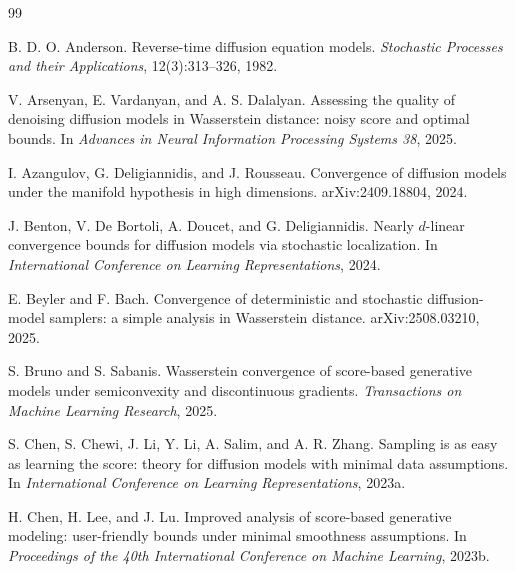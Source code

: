 \documentclass[11pt]{article}
\theoremstyle{breakstyle}
\begin{document}
\begin{thebibliography}{99}

B. D. O. Anderson.
\newblock Reverse-time diffusion equation models.
\newblock \emph{Stochastic Processes and their Applications}, 12(3):313--326, 1982.

V. Arsenyan, E. Vardanyan, and A. S. Dalalyan.
\newblock Assessing the quality of denoising diffusion models in Wasserstein distance: noisy score and optimal bounds.
\newblock In \emph{Advances in Neural Information Processing Systems 38}, 2025.

I. Azangulov, G. Deligiannidis, and J. Rousseau.
\newblock Convergence of diffusion models under the manifold hypothesis in high dimensions.
\newblock arXiv:2409.18804, 2024.

J. Benton, V. De Bortoli, A. Doucet, and G. Deligiannidis.
\newblock Nearly $d$-linear convergence bounds for diffusion models via stochastic localization.
\newblock In \emph{International Conference on Learning Representations}, 2024.

E. Beyler and F. Bach.
\newblock Convergence of deterministic and stochastic diffusion-model samplers: a simple analysis in Wasserstein distance.
\newblock arXiv:2508.03210, 2025.

S. Bruno and S. Sabanis.
\newblock Wasserstein convergence of score-based generative models under semiconvexity and discontinuous gradients.
\newblock \emph{Transactions on Machine Learning Research}, 2025.

S. Chen, S. Chewi, J. Li, Y. Li, A. Salim, and A. R. Zhang.
\newblock Sampling is as easy as learning the score: theory for diffusion models with minimal data assumptions.
\newblock In \emph{International Conference on Learning Representations}, 2023a.

H. Chen, H. Lee, and J. Lu.
\newblock Improved analysis of score-based generative modeling: user-friendly bounds under minimal smoothness assumptions.
\newblock In \emph{Proceedings of the 40th International Conference on Machine Learning}, 2023b.


\end{thebibliography}
\end{document}
